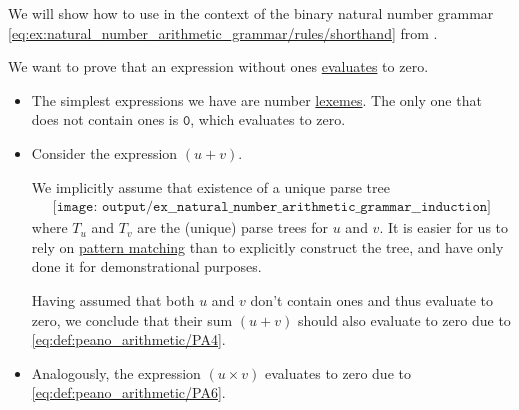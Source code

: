 \begin{example}\label{ex:natural_number_arithmetic_grammar/induction}
  We will show how to use  in the context of the binary natural number grammar \eqref{eq:ex:natural_number_arithmetic_grammar/rules/shorthand} from .

  We want to prove that an expression without ones \hyperref[rem:evaluation]{evaluates} to zero.

  \begin{itemize}
    \item The simplest expressions we have are number \hyperref[rem:abstract_syntax_tree/lexical]{lexemes}. The only one that does not contain ones is \( \mathtt{0} \), which evaluates to zero.

    \item Consider the expression \( (u + v) \).

    We implicitly assume that existence of a unique parse tree
    \begin{equation*}
      \begin{aligned}
        \texttt{[image: output/ex\_\_natural\_number\_arithmetic\_grammar\_\_induction]}
      \end{aligned}
    \end{equation*}
    where \( T_u \) and \( T_v \) are the (unique) parse trees for \( u \) and \( v \). It is easier for us to rely on \hyperref[rem:evaluation]{pattern matching} than to explicitly construct the tree, and have only done it for demonstrational purposes.

    Having assumed that both \( u \) and \( v \) don't contain ones and thus evaluate to zero, we conclude that their sum \( (u + v) \) should also evaluate to zero due to \ref{eq:def:peano_arithmetic/PA4}.

    \item Analogously, the expression \( (u \times v) \) evaluates to zero due to \ref{eq:def:peano_arithmetic/PA6}.
  \end{itemize}
\end{example}


